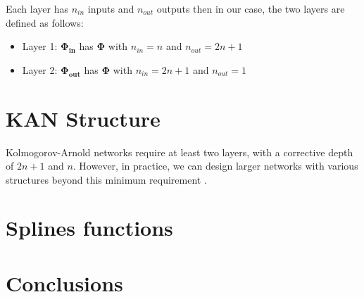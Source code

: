 \documentclass[12pt,a4paper]{article}
\begin{document}
Each layer has $n_{in}$ inputs and $n_{out}$ outputs then in our case, the two layers are defined as follows:
\begin{itemize}
    \item Layer 1: $\boldsymbol{\Phi_{in}}$ has $\boldsymbol{\Phi}$ with $n_{in} = n$ and $n_{out} = 2n+1$
    \item Layer 2: $\boldsymbol{\Phi_{out}}$ has $\boldsymbol{\Phi}$ with $n_{in} = 2n+1$ and $n_{out} = 1$
\end{itemize}

\section{KAN Structure}
Kolmogorov-Arnold networks require at least two layers, with a corrective depth of \(2n+1\) and \(n\). However, in practice, we can design larger networks with various structures beyond this minimum requirement \cite{KAN}.

\section{Splines functions}


\section{Conclusions}


\end{document}
